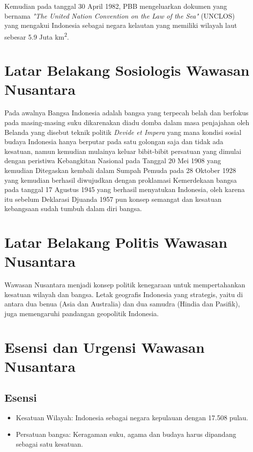 \documentclass[12pt, a4paper]{article}
\begin{document}
Kemudian pada tanggal 30 April 1982, PBB mengeluarkan dokumen yang bernama \textit{"The United Nation Convention on the Law of the Sea"} \cite{UN1982} (UNCLOS) yang mengakui Indonesia sebagai negara kelautan yang memiliki wilayah laut sebesar 5.9 Juta km\textsuperscript{2}.


\section{Latar Belakang Sosiologis Wawasan Nusantara}
Pada awalnya Bangsa Indonesia adalah bangsa yang terpecah belah dan berfokus pada masing-masing suku dikarenakan diadu domba dalam masa penjajahan oleh Belanda yang disebut teknik politik \textit{Devide et Impera} yang mana kondisi sosial budaya Indonesia hanya berputar pada satu golongan saja dan tidak ada kesatuan, namun kemudian mulainya keluar bibit-bibit persatuan yang dimulai dengan peristiwa Kebangkitan Nasional pada Tanggal 20 Mei 1908 yang kemudian Ditegaskan kembali dalam Sumpah Pemuda pada 28 Oktober 1928 yang kemudian berhasil diwujudkan dengan proklamasi Kemerdekaan bangsa pada tanggal 17 Agustus 1945 yang berhasil menyatukan Indonesia, oleh karena itu sebelum Deklarasi Djuanda 1957 pun konsep semangat dan kesatuan kebangsaan sudah tumbuh dalam diri bangsa.


\section{Latar Belakang Politis Wawasan Nusantara}
Wawasan Nusantara menjadi konsep politik kenegaraan untuk mempertahankan kesatuan wilayah dan bangsa. Letak geografis Indonesia yang strategis, yaitu di antara dua benua (Asia dan Australia) dan dua samudra (Hindia dan Pasifik), juga memengaruhi pandangan geopolitik Indonesia.

\section{Esensi dan Urgensi Wawasan Nusantara}
\subsection*{Esensi}
\begin{itemize}
    \item Kesatuan Wilayah: Indonesia sebagai negara kepulauan dengan 17.508 pulau.
    \item Persatuan bangsa: Keragaman suku, agama dan budaya harus dipandang sebagai satu kesatuan.
\end{itemize}
\end{document}
